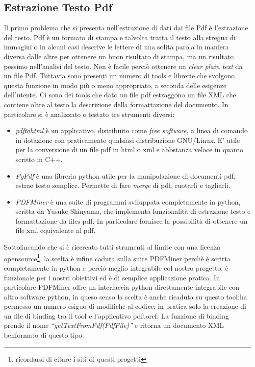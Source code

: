 \subsection{Estrazione Testo Pdf}
Il primo problema che si presenta nell'estrazione di dati dai file Pdf è l'estrazione del testo. Pdf è un formato di stampa e talvolta tratta il testo alla stregua di immagini o in alcuni casi descrive le lettere di una solita parola in maniera diversa dalle altre per ottenere un buon risultato di stampa, ma un risultato pessimo nell'analisi del testo. Non è facile perciò ottenere un \textit{clear plain text} da un file Pdf. Tuttavia sono presenti un numero di tools e librerie che svolgono questa funzione in modo più o meno appropriato, a seconda delle esigenze dell'utente. Ci sono dei tools che dato un file pdf estraggono un file XML che contiene oltre al testo la descrizione della formattazione del documento. 
In particolare si è analizzato e testato tre strumenti diversi:
\begin{itemize}
 \item \textit{pdftohtml} è un applicativo, distribuito come \textit{free software}, a linea di comando in dotazione con praticamente qualsiasi distribuzione GNU/Linux. E' utile per la conversione di un file pdf in html o xml e abbstanza veloce in quanto scritto in C++.
 \item \textit{PyPdf} è una libreria python utile per la manipolazione di documenti pdf, estrae testo semplice. Permette di fare \textit{merge} di pdf, ruotarli e tagliarli.
 \item \textit{PDFMiner} è una suite di programmi sviluppata completamente in python, scritta da Yusuke Shinyama, che implementa funzionalità di estrazione testo e formattazione da files pdf. In particolare fornisce la possibilità di ottenere un file xml equivalente al pdf.
\end{itemize}

Sottolineando che si è ricercato tutti strumenti al limite con una licenza opensource\footnote{ricordarsi di citare i siti di questi progetti}, la scelta è infine caduta sulla suite PDFMiner perchè è scritta completamente in python e perciò meglio integrabile col nostro progetto, è funzionale per i nostri obiettivi ed è di semplice applicazione pratica.
In particolare PDFMiner offre un interfaccia python direttamente integrabile con altro software python, in queso senso la scelta è anche ricaduta su questo tool:ha permesso un numero esiguo di modifiche al codice; in pratica solo la creazione di un file di binding tra il tool e l'applicativo pdftoref. La funzione di binding prende il nome \textit{``getTextFromPdf(PdfFile)''} e ritorna un documento XML benformato di questo tipo:


